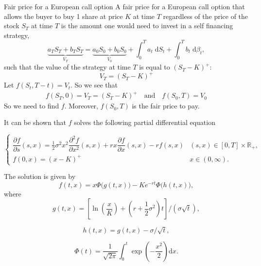 \documentclass{beamer}%
\numberwithin{equation}{section}
\newcommand{\R}{\mathbb{R}}
\newcommand{\ud}{\ensuremath{\mathrm{d} }}
\begin{document}
\begin{frame}{Fair price for a European call option}
	A fair price for a European call option that allows the buyer to buy 1 share at price $K$ at time $T$ regardless of the price of the stock $S_T$ at time $T$ is the amount one would need to invest in a self financing strategy,
		\[
			\underbrace{a_TS_T + b_TS_T}_{V_T} = \underbrace{a_0S_0 + b_0S_0}_{V_0} +  \int_0^T a_t \; \ud S_t + \int_0^T b_t \; \ud \beta_t ,
		\]
	such that the value of the strategy at time $T$ is equal to $(S_T - K)^+$:
		\[
				V_T = (S_T - K)^+
		\]
	Let $f(S_t, T-t) = V_t$. So we see that
	 \begin{align*}
	 f(S_T, 0) = V_T = (S_T - K)^+ \quad \text{and} \quad  f(S_0, T) =V_0
	 \end{align*}
	So we need to find $f$. Moreover, $f(S_0, T)$ is the fair price to pay.
	\end{frame}

\begin{frame}
  It can be shown that $f$ solves the following partial differential equation

	\[
		\begin{cases}
			\dfrac{\partial f}{\partial s}(s, x) = \frac{1}{2} \sigma^2 x^2 \dfrac{\partial^2f}{\partial x^2}(s,x) + rx\dfrac{\partial f}{\partial x}(s,x) - r f(s,x) & (s,x) \in [0,T] \times \R_+, \\[1em]
			f(0,x) = (x-K)^+                                                                                                                                          & x \in (0,\infty).
		\end{cases}
	\]
  \pause
  \bigskip

  The solution is given by
	\[
		f(t,x) = x \Phi\big(g(t,x)\big) - K e^{-rt}\Phi\big( h(t,x) \big),
	\]
  where
	\[
		g(t,x) = \left[ \ln\left(\frac{x}{K}\right) + \left(r  +\frac{1}{2} \sigma^2\right) t \right] / (\sigma \sqrt{t}),
	\]

	\[
		h(t,x) = g(t,x) - \sigma / \sqrt{t},
	\]

	\[
		\Phi(t) = \frac{1}{\sqrt{2\pi}}\int_0^t \exp\left(-\frac{x^2}{2}\right) \ud x.
	\]
\end{frame}
\end{document}
